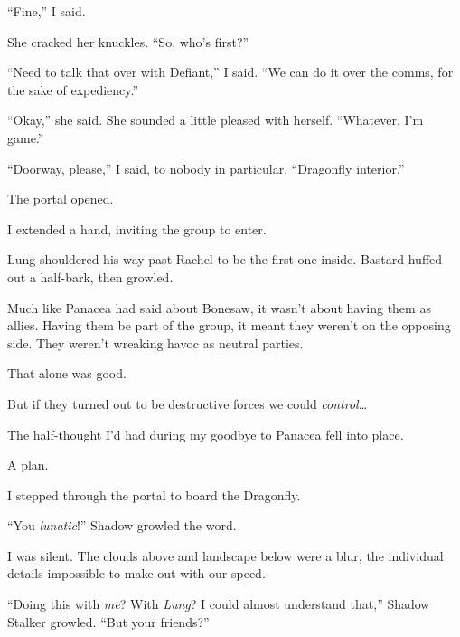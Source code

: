 ``Fine,'' I said.



She cracked her knuckles.  ``So, who's first?''



``Need to talk that over with Defiant,'' I said.  ``We can do it over the comms, for the sake of expediency.''



``Okay,'' she said.  She sounded a little pleased with herself.  ``Whatever.  I'm game.''



``Doorway, please,'' I said, to nobody in particular.  ``Dragonfly interior.''



The portal opened.



I extended a hand, inviting the group to enter.



Lung shouldered his way past Rachel to be the first one inside.  Bastard huffed out a half-bark, then growled.



Much like Panacea had said about Bonesaw, it wasn't about having them as allies.  Having them be part of the group, it meant they weren't on the opposing side.  They weren't wreaking havoc as neutral parties.



That alone was good.



But if they turned out to be destructive forces we could \emph{control}\ldots



The half-thought I'd had during my goodbye to Panacea fell into place.



A plan.



I stepped through the portal to board the Dragonfly.



\sectionbreak



``You \emph{lunatic}!''  Shadow growled the word.



I was silent.  The clouds above and landscape below were a blur, the individual details impossible to make out with our speed.



``Doing this with \emph{me}?  With \emph{Lung}?  I could almost understand that,'' Shadow Stalker growled.  ``But your friends?''



